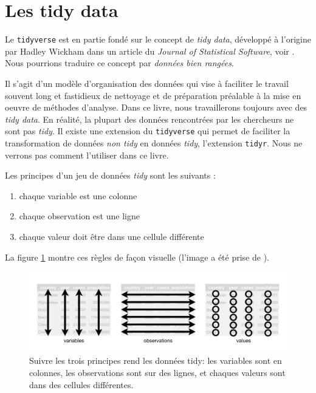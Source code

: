 \documentclass[]{book}
\providecommand{\tightlist}{%
  \setlength{\itemsep}{0pt}\setlength{\parskip}{0pt}}
\theoremstyle{definition}
\theoremstyle{definition}
\theoremstyle{definition}
\theoremstyle{remark}
\begin{document}
\hypertarget{tidydata}{%
\section{Les tidy data}\label{tidydata}}

Le \texttt{tidyverse} est en partie fondé sur le concept de \emph{tidy
data}, développé à l'origine par Hadley Wickham dans un article du
\emph{Journal of Statistical Software}, voir \citep{wickham2014}. Nous
pourrions traduire ce concept par \emph{données bien rangées}.

Il s'agit d'un modèle d'organisation des données qui vise à faciliter le
travail souvent long et fastidieux de nettoyage et de préparation
préalable à la mise en oeuvre de méthodes d'analyse. Dans ce livre, nous
travaillerons toujours avec des \emph{tidy data}. En réalité, la plupart
des données rencontrées par les chercheurs ne sont pas \emph{tidy}. Il
existe une extension du \texttt{tidyverse} qui permet de faciliter la
transformation de données \emph{non tidy} en données \emph{tidy},
l'extension \texttt{tidyr}. Nous ne verrons pas comment l'utiliser dans
ce livre.

Les principes d'un jeu de données \emph{tidy} sont les suivants :

\begin{enumerate}
\def\labelenumi{\arabic{enumi}.}
\tightlist
\item
  chaque variable est une colonne
\item
  chaque observation est une ligne
\item
  chaque valeur doit être dans une cellule différente
\end{enumerate}

La figure \ref{fig:tidy-structure} montre ces règles de façon visuelle
(l'image a été prise de \citep{wickham2017}).

\begin{figure}

{\centering \includegraphics[width=1\linewidth]{images/tidy-1} 

}

\caption{Suivre les trois principes rend les données tidy: les variables sont en colonnes, les observations sont sur des lignes, et chaques valeurs sont dans des cellules différentes.}\label{fig:tidy-structure}
\end{figure}
\end{document}
